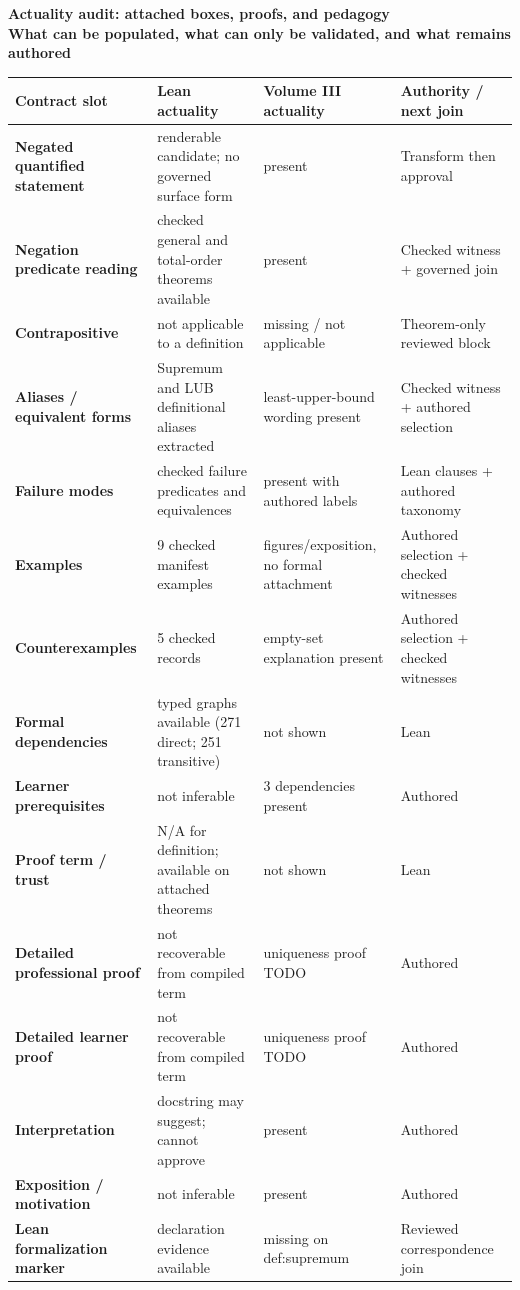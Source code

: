 \documentclass[10pt]{article}
\newcommand{\PageTitle}[2]{\begin{center}\sffamily\Large\bfseries #1\\[-1pt]\small\mdseries #2\end{center}\vspace{-4pt}}
\newcommand{\AuditHead}{\textbf{Contract slot} & \textbf{Lean actuality} & \textbf{Volume III actuality} & \textbf{Authority / next join}\\}
\begin{document}
\PageTitle{Actuality audit: attached boxes, proofs, and pedagogy}{What can be populated, what can only be validated, and what remains authored}
\scriptsize
\renewcommand{\arraystretch}{1.22}
\begin{tabularx}{\textwidth}{@{}p{}X X p{}@{}}
\toprule
\AuditHead
\midrule
\textbf{Negated quantified statement} & renderable candidate; no governed surface form & present & Transform then approval \\
\textbf{Negation predicate reading} & checked general and total-order theorems available & present & Checked witness + governed join \\
\textbf{Contrapositive} & not applicable to a definition & missing / not applicable & Theorem-only reviewed block \\
\textbf{Aliases / equivalent forms} & Supremum and LUB definitional aliases extracted & least-upper-bound wording present & Checked witness + authored selection \\
\textbf{Failure modes} & checked failure predicates and equivalences & present with authored labels & Lean clauses + authored taxonomy \\
\textbf{Examples} & 9 checked manifest examples & figures/exposition, no formal attachment & Authored selection + checked witnesses \\
\textbf{Counterexamples} & 5 checked records & empty-set explanation present & Authored selection + checked witnesses \\
\textbf{Formal dependencies} & typed graphs available (271 direct; 251 transitive) & not shown & Lean \\
\textbf{Learner prerequisites} & not inferable & 3 dependencies present & Authored \\
\textbf{Proof term / trust} & N/A for definition; available on attached theorems & not shown & Lean \\
\textbf{Detailed professional proof} & not recoverable from compiled term & uniqueness proof TODO & Authored \\
\textbf{Detailed learner proof} & not recoverable from compiled term & uniqueness proof TODO & Authored \\
\textbf{Interpretation} & docstring may suggest; cannot approve & present & Authored \\
\textbf{Exposition / motivation} & not inferable & present & Authored \\
\textbf{Lean formalization marker} & declaration evidence available & missing on def:supremum & Reviewed correspondence join \\
\bottomrule
\end{tabularx}
\end{document}
